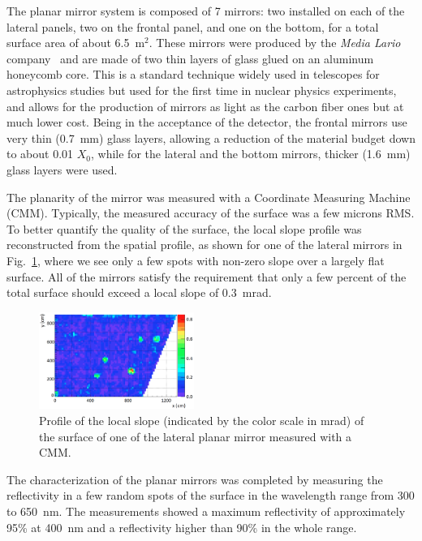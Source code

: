 \documentclass[5p,times,twocolumn]{elsarticle}
\begin{document}
The planar mirror system is composed of 7 mirrors: two installed on each of the lateral panels, two on the frontal panel,
and one on the bottom, for a total surface area of about 6.5~m$^2$. These mirrors were produced by the {\it Media
Lario} company~\cite{REF:MediaLario} and are made of two thin layers of glass glued on an aluminum honeycomb core.
This is a standard technique widely used in telescopes for astrophysics studies but used for the first time in nuclear
physics experiments, and allows for the production of mirrors as light as the carbon fiber ones but at much lower cost.
Being in the acceptance of the detector, the frontal mirrors use very thin (0.7~mm) glass layers, allowing a reduction of
the material budget down to about 0.01 $X_0$, while for the lateral and the bottom mirrors, thicker (1.6~mm) glass
layers were used.

The planarity of the mirror was measured with a Coordinate Measuring Machine (CMM). Typically, the measured
accuracy of the surface was a few microns RMS. To better quantify the quality of the surface, the local slope profile
was reconstructed from the spatial profile, as shown for one of the lateral mirrors in Fig.~\ref{Fig:SlopeML}, where
we see only a few spots with non-zero slope over a largely flat surface. All of the mirrors satisfy the requirement that
only a few percent of the total surface should exceed a local slope of 0.3~mrad.

\begin{figure}
\begin{center}
\includegraphics[width=0.45\textwidth]{SlopeML2.png}
\caption{Profile of the local slope (indicated by the color scale in mrad) of the surface of one of the lateral planar
  mirror measured with a CMM.}
\label{Fig:SlopeML}
\end{center}
\end{figure}

The characterization of the planar mirrors was completed by measuring the reflectivity in a few random spots of
the surface in the wavelength range from 300 to 650~nm. The measurements showed a maximum reflectivity of
approximately 95\% at 400~nm and a reflectivity higher than 90\% in the whole range.
\end{document}
